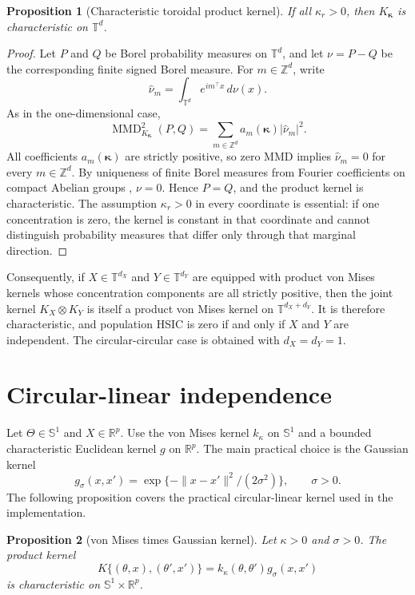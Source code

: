 \documentclass[11pt]{article}
\newtheorem{proposition}{Proposition}
\newcommand{\Sone}{\mathbb S^1}
\newcommand{\Td}{\mathbb T^d}
\newcommand{\R}{\mathbb R}
\newcommand{\MMD}{\operatorname{MMD}}
\begin{document}
\begin{proposition}[Characteristic toroidal product kernel]
If all \(\kappa_r>0\), then \(K_{\boldsymbol\kappa}\) is characteristic on \(\Td\).
\end{proposition}

\begin{proof}
Let \(P\) and \(Q\) be Borel probability measures on \(\Td\), and let \(\nu=P-Q\) be the corresponding finite signed Borel measure.  For \(m\in\mathbb Z^d\), write
\[
  \widehat\nu_m=\int_{\Td} e^{i m^\top x}\,d\nu(x).
\]
As in the one-dimensional case,
\[
  \MMD^2_{K_{\boldsymbol\kappa}}(P,Q)
  =
  \sum_{m\in\mathbb Z^d} a_m(\boldsymbol\kappa)|\widehat\nu_m|^2 .
\]
All coefficients \(a_m(\boldsymbol\kappa)\) are strictly positive, so zero MMD implies \(\widehat\nu_m=0\) for every \(m\in\mathbb Z^d\).  By uniqueness of finite Borel measures from Fourier coefficients on compact Abelian groups \citep{rudin1962fourier}, \(\nu=0\).  Hence \(P=Q\), and the product kernel is characteristic.  The assumption \(\kappa_r>0\) in every coordinate is essential: if one concentration is zero, the kernel is constant in that coordinate and cannot distinguish probability measures that differ only through that marginal direction.
\end{proof}

Consequently, if \(X\in\mathbb T^{d_X}\) and \(Y\in\mathbb T^{d_Y}\) are equipped with product von Mises kernels whose concentration components are all strictly positive, then the joint kernel \(K_X\otimes K_Y\) is itself a product von Mises kernel on \(\mathbb T^{d_X+d_Y}\).  It is therefore characteristic, and population HSIC is zero if and only if \(X\) and \(Y\) are independent.  The circular-circular case is obtained with \(d_X=d_Y=1\).

\section{Circular-linear independence}

Let \(\Theta\in\Sone\) and \(X\in\R^p\).  Use the von Mises kernel \(k_\kappa\) on \(\Sone\) and a bounded characteristic Euclidean kernel \(g\) on \(\R^p\).  The main practical choice is the Gaussian kernel
\[
  g_\sigma(x,x')=\exp\{-\|x-x'\|^2/(2\sigma^2)\},
  \qquad \sigma>0.
\]
The following proposition covers the practical circular-linear kernel used in the implementation.

\begin{proposition}[von Mises times Gaussian kernel]
Let \(\kappa>0\) and \(\sigma>0\).  The product kernel
\[
  K\{(\theta,x),(\theta',x')\}
  =
  k_\kappa(\theta,\theta')g_\sigma(x,x')
\]
is characteristic on \(\Sone\times\R^p\).
\end{proposition}
\end{document}
